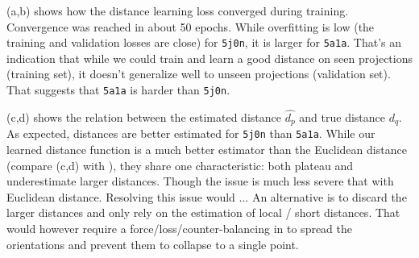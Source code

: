 (a,b) shows how the distance learning loss converged during training.
Convergence was reached in about 50 epochs. %
While overfitting is low (the training and validation losses are close) for \texttt{5j0n}, it is larger for \texttt{5a1a}.
That's an indication that while we could train and learn a good distance on seen projections (training set), it doesn't generalize well to unseen projections (validation set).
That suggests that \texttt{5a1a} is harder than \texttt{5j0n}. 

(c,d) shows the relation between the estimated distance $\widehat{d_p}$ and true distance $d_q$.
As expected, distances are better estimated for \texttt{5j0n} than \texttt{5a1a}.
While our learned distance function is a much better estimator than the Euclidean distance (compare (c,d) with ), they share one characteristic: both plateau and underestimate larger distances.
Though the issue is much less severe that with Euclidean distance.
Resolving this issue would ...
An alternative is to discard the larger distances and only rely on the estimation of local / short distances.
That would however require a force/loss/counter-balancing in  to spread the orientations and prevent them to collapse to a single point.

